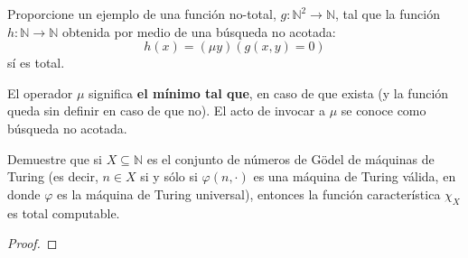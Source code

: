 \documentclass[12pt]{report}
\theoremstyle{largebreak}
\newcommand\cf[3]{\ensuremath{#1:#2\rightarrow#3}}
\begin{document}
    \begin{excer}
        Proporcione un ejemplo de una función no-total, $\cf{g}{\mathbb{N}^2}{\mathbb{N}}$, tal que la función $\cf{h}{\mathbb{N}}{\mathbb{N}}$ obtenida por medio de una búsqueda no acotada:
        \begin{equation*}
            h(x)=(\mu y)(g(x,y)=0)
        \end{equation*}
        sí es total.
    \end{excer}

    \begin{sol}
        
    \end{sol}

    \begin{mydef}
        El operador $\mu$ significa \textbf{el mínimo tal que}, en caso de que exista (y la función queda sin definir en caso de que no). El acto de invocar a $\mu$ se conoce como búsqueda no acotada.
    \end{mydef}

    \begin{excer}
        Demuestre que si $X\subseteq\mathbb{N}$ es el conjunto de números de Gödel de máquinas de Turing (es decir, $n\in X$ si y sólo si $\varphi(n,\cdot)$ es una máquina de Turing válida, en donde $\varphi$ es la máquina de Turing universal), entonces la función característica $\chi_X$ es total computable.
    \end{excer}

    \begin{proof}
        
    \end{proof}

    
\end{document}
